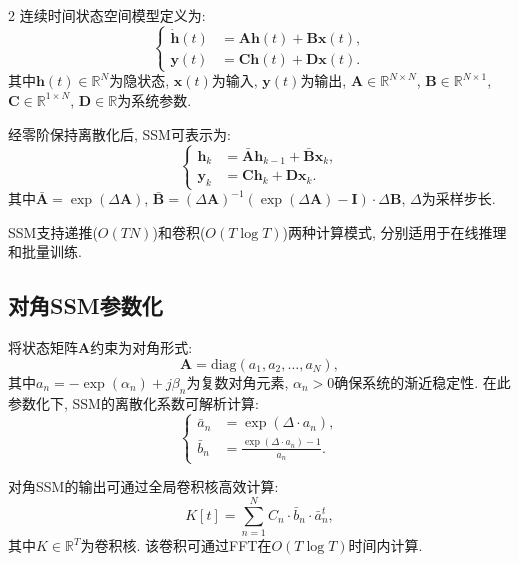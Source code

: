 \begin{multicols}{2}
连续时间状态空间模型定义为:
\begin{equation}
\left\{\begin{aligned}
\dot{{\bm h}}(t) &= {\bm A}{\bm h}(t) + {\bm B}{\bm x}(t),\\
{\bm y}(t) &= {\bm C}{\bm h}(t) + {\bm D}{\bm x}(t).
\end{aligned}\right.
\end{equation}
其中${\bm h}(t) \in \mathbb{R}^{N}$为隐状态, ${\bm x}(t)$为输入, ${\bm y}(t)$为输出,
${\bm A} \in \mathbb{R}^{N \times N}$, ${\bm B} \in \mathbb{R}^{N \times 1}$,
${\bm C} \in \mathbb{R}^{1 \times N}$, ${\bm D} \in \mathbb{R}$为系统参数.

经零阶保持离散化后, SSM可表示为:
\begin{equation}
\left\{\begin{aligned}
{\bm h}_k &= \bar{{\bm A}}{\bm h}_{k-1} + \bar{{\bm B}}{\bm x}_k,\\
{\bm y}_k &= {\bm C}{\bm h}_k + {\bm D}{\bm x}_k.
\end{aligned}\right.
\end{equation}
其中$\bar{{\bm A}} = \exp(\Delta {\bm A})$, $\bar{{\bm B}} = (\Delta {\bm A})^{-1}(\exp(\Delta {\bm A}) - {\bm I}) \cdot \Delta {\bm B}$,
$\Delta$为采样步长.

SSM支持递推($O(TN)$)和卷积($O(T\log T)$)两种计算模式, 分别适用于在线推理和批量训练.

\subsection{对角SSM参数化}

将状态矩阵${\bm A}$约束为对角形式:
\begin{equation}
{\bm A} = \text{diag}(a_1, a_2, \ldots, a_N),
\end{equation}
其中$a_n = -\exp(\alpha_n) + j\beta_n$为复数对角元素,
$\alpha_n > 0$确保系统的渐近稳定性.
在此参数化下, SSM的离散化系数可解析计算:
\begin{equation}
\left\{\begin{aligned}
\bar{a}_n &= \exp(\Delta \cdot a_n), \\
\bar{b}_n &= \frac{\exp(\Delta \cdot a_n) - 1}{a_n}.
\end{aligned}\right.
\end{equation}

对角SSM的输出可通过全局卷积核高效计算:
\begin{equation}
K[t] = \sum_{n=1}^{N} C_n \cdot \bar{b}_n \cdot \bar{a}_n^t,
\end{equation}
其中$K \in \mathbb{R}^T$为卷积核.
该卷积可通过FFT在$O(T\log T)$时间内计算.


\end{multicols}
